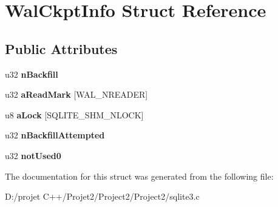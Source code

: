 \hypertarget{struct_wal_ckpt_info}{}\section{Wal\+Ckpt\+Info Struct Reference}
\label{struct_wal_ckpt_info}
\subsection*{Public Attributes}
\begin{DoxyCompactItemize}
\item 
\mbox{\label{struct_wal_ckpt_info_a5185e508f7da44c391b692e957a84ff6}} 
u32 {\bfseries n\+Backfill}
\item 
\mbox{\label{struct_wal_ckpt_info_a3bc01a8244045941d5f59f01123a7735}} 
u32 {\bfseries a\+Read\+Mark} \mbox{[}W\+A\+L\+\_\+\+N\+R\+E\+A\+D\+ER\mbox{]}
\item 
\mbox{\label{struct_wal_ckpt_info_a0aaaef8cfe5d45c613de6b63ea185d41}} 
u8 {\bfseries a\+Lock} \mbox{[}S\+Q\+L\+I\+T\+E\+\_\+\+S\+H\+M\+\_\+\+N\+L\+O\+CK\mbox{]}
\item 
\mbox{\label{struct_wal_ckpt_info_a3598a8ba26b253492f9c1fa0d078b3a5}} 
u32 {\bfseries n\+Backfill\+Attempted}
\item 
\mbox{\label{struct_wal_ckpt_info_ac33050a373fd89719253c3cddcc9e5fe}} 
u32 {\bfseries not\+Used0}
\end{DoxyCompactItemize}


The documentation for this struct was generated from the following file\+:\begin{DoxyCompactItemize}
\item 
D\+:/projet C++/\+Projet2/\+Project2/\+Project2/sqlite3.\+c\end{DoxyCompactItemize}
